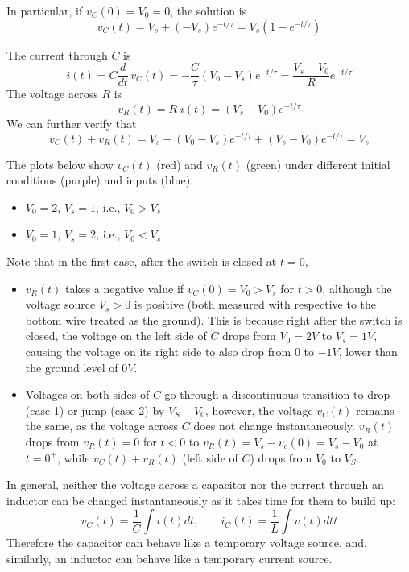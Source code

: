In particular, if $v_C(0)=V_0=0$, the solution is
\[
v_C(t)=V_s+(-V_s) e^{-t/\tau}=V_s(1-e^{-t/\tau})		
\]

The current through $C$ is
\[
i(t)=C\frac{d}{dt}\,v_C(t)=-\frac{C}{\tau}(V_0-V_s)e^{-t/\tau}
=\frac{V_s-V_0}{R}e^{-t/\tau} 
\]
The voltage across $R$ is
\[ 
v_R(t)=R\; i(t)=(V_s-V_0) e^{-t/\tau} 
\]
We can further verify that
\[
v_C(t)+v_R(t)=V_s+(V_0-V_s) e^{-t/\tau}+(V_s-V_0) e^{-t/\tau} =V_s	
\]

The plots below show $v_C(t)$ (red) and $v_R(t)$ (green) under different
initial conditions (purple) and inputs (blue).

\begin{itemize}
\item $V_0=2$, $V_s=1$, i.e., $V_0>V_s$

\item $V_0=1$, $V_s=2$, i.e., $V_0<V_s$

\end{itemize}

Note that in the first case, after the switch is closed at $t=0$, 

\begin{itemize}
\item $v_R(t)$ takes a negative value if $v_C(0)=V_0>V_s$ for $t>0$, although
  the voltage source $V_s>0$ is positive (both measured with respective to 
  the bottom wire treated as the ground). This is because right after the
  switch is closed, the voltage on the left side of $C$ drops from 
  $V_0=2V$ to $V_s=1V$, causing the voltage on its right side to also drop 
  from $0$ to $-1V$, lower than the ground level of $0V$.
\item Voltages on both sides of $C$ go through a discontinuous transition to
  drop (case 1) or jump (case 2) by $V_S-V_0$, however, the voltage $v_C(t)$ 
  remains the same, as the voltage across $C$ does not change instantaneously. 
  $v_R(t)$ drops from $v_R(t)=0$ for $t<0$ to $v_R(t)=V_s-v_c(0)=V_s-V_0$ at 
  $t=0^+$, while $v_C(t)+v_R(t)$ (left side of $C$) drops from $V_0$ to $V_S$.
\end{itemize}

In general, neither the voltage across a capacitor nor the current through
an inductor can be changed instantaneously as it takes time for them to 
build up:
\[
v_C(t)=\frac{1}{C}\int i(t) dt,\;\;\;\;\;\;\;i_C(t)=\frac{1}{L}\int v(t) dtt
\]
Therefore the capacitor can behave like a temporary voltage source, and,
similarly, an inductor can behave like a temporary current source.


